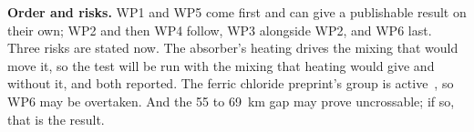\textbf{Order and risks.} WP1 and WP5 come first and can give a publishable result on
their own; WP2 and then WP4 follow, WP3 alongside WP2, and WP6 last. Three risks are
stated now. The absorber's heating drives the mixing that would move it, so the test will
be run with the mixing that heating would give and without it, and both reported. The
ferric chloride preprint's group is active~\cite{egan2026}, so WP6 may be overtaken. And
the 55 to 69~km gap may prove uncrossable; if so, that is the result.
